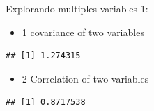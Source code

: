 \documentclass[ignorenonframetext,]{beamer}
\newenvironment{Shaded}{\begin{snugshade}}{\end{snugshade}}
\newcommand{\KeywordTok}[1]{\textcolor[rgb]{0.13,0.29,0.53}{\textbf{#1}}}
\newcommand{\OperatorTok}[1]{\textcolor[rgb]{0.81,0.36,0.00}{\textbf{#1}}}
\newcommand{\NormalTok}[1]{#1}
\providecommand{\tightlist}{%
  \setlength{\itemsep}{0pt}\setlength{\parskip}{0pt}}
\begin{document}
\begin{frame}[fragile]{Explorando multiples variables 1:}

\begin{itemize}
\tightlist
\item
  1 covariance of two variables
\end{itemize}

\begin{Shaded}
\end{Shaded}

\begin{verbatim}
## [1] 1.274315
\end{verbatim}

\begin{itemize}
\tightlist
\item
  2 Correlation of two variables
\end{itemize}

\begin{Shaded}
\end{Shaded}

\begin{verbatim}
## [1] 0.8717538
\end{verbatim}

\end{frame}
\end{document}
